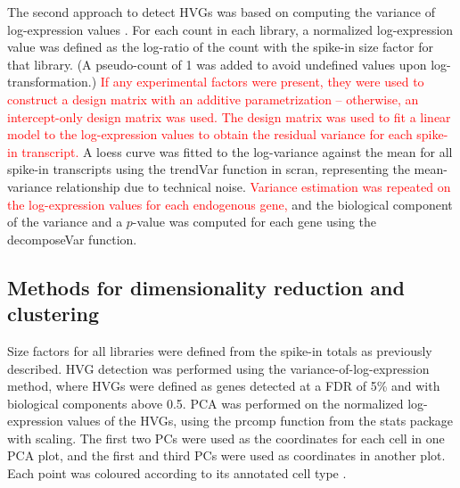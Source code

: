 \documentclass{article}
\newcommand\revised[1]{\textcolor{red}{#1}}
\begin{document}
The second approach to detect HVGs was based on computing the variance of log-expression values \citep{lun2016stepbystep}.
For each count in each library, a normalized log-expression value was defined as the log-ratio of the count with the spike-in size factor for that library.
(A pseudo-count of 1 was added to avoid undefined values upon log-transformation.)
\revised{If any experimental factors were present, they were used to construct a design matrix with an additive parametrization -- otherwise, an intercept-only design matrix was used.
The design matrix was used to fit a linear model to the log-expression values to obtain the residual variance for each spike-in transcript.}
A loess curve was fitted to the log-variance against the mean for all spike-in transcripts using the trendVar function in scran, representing the mean-variance relationship due to technical noise.
\revised{Variance estimation was repeated on the log-expression values for each endogenous gene,} and the biological component of the variance and a $p$-value was computed for each gene using the decomposeVar function.

\subsection{Methods for dimensionality reduction and clustering}
Size factors for all libraries were defined from the spike-in totals as previously described. 
HVG detection was performed using the variance-of-log-expression method, where HVGs were defined as genes detected at a FDR of 5\% and with biological components above 0.5.
PCA was performed on the normalized log-expression values of the HVGs, using the prcomp function from the stats package with scaling.
The first two PCs were used as the coordinates for each cell in one PCA plot, and the first and third PCs were used as coordinates in another plot.
Each point was coloured according to its annotated cell type \citep{segerstople2016single}.
\end{document}
